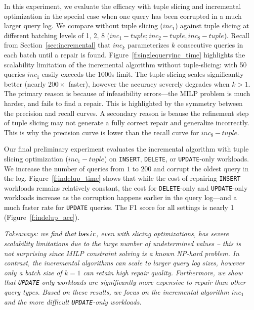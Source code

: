 In this experiment, we evaluate the efficacy \sys with tuple slicing and incremental optimization
in the special case when one query has been corrupted in a much larger query log. 
We compare \incremental without tuple slicing ($inc_1$) against tuple slicing at 
different batching levels of 1, 2, 8 ($inc_1-tuple; inc_2-tuple, inc_8-tuple$). 
Recall from Section~\ref{sec:incremental} that $inc_k$ parameterizes $k$ consecutive queries in each batch until a repair is found.
Figure~\ref{f:singlequeryinc_time} highlights the scalability limitation of the incremental 
algorithm without tuple-slicing: with 50 queries $inc_1$  easily exceeds the 1000s limit.   
The tuple-slicing scales significantly better (nearly $200\times$ faster), however
the accuracy severely degrades when $k>1$.  
The primary reason is because of infeasibility errors---the MILP problem is much harder, and fails to find a repair.  
This is highlighted by the symmetry between the precision and recall curves.  
A secondary reason is beause the refinement step of  tuple slicing may not generate a fully correct repair and generalize incorrectly.
This is why the precision curve is lower than the recall curve for $inc_8-tuple$.




\label{sec:indelup}
Our final preliminary experiment evaluates the incremental algorithm with tuple slicing optimization 
($inc_1-tuple$) on \texttt{INSERT}, \texttt{DELETE}, or \texttt{UPDATE}-only workloads.
We increase the number of queries from $1$ to $200$ and corrupt the oldest query in the log.  
Figure~\ref{f:indelup_time} shows that while the cost of repairing \texttt{INSERT} workloads
remains relatively constant, the cost for \texttt{DELETE}-only and \texttt{UPDATE}-only workloads increase as 
the corruption happens earlier in the query log---and a much faster rate for \texttt{UPDATE} queries.
The F1 score for all settings is nearly 1 (Figure~\ref{f:indelup_acc}).

\smallskip
{\it Takeaways: we find that \texttt{basic}, even with slicing optimizations,
has severe scalability limitations due to the large number of undetermined values -- this is not surprising
since MILP constraint solving is a known NP-hard problem.
In contrast, the incremental algorithms can scale to larger query log sizes, however only a batch size of $k=1$ can retain high repair quality.
Furthermore, we show that \texttt{UPDATE}-only workloads are significantly more expensive to repair than other query types. 
Based on these results, we focus on the incremental algorithm $inc_1$ and the more difficult \texttt{UPDATE}-only workloads.
}

